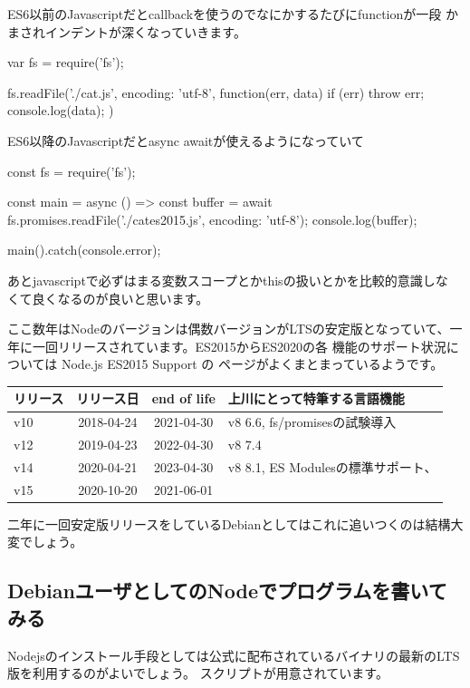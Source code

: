 \documentclass[mingoth,a4paper]{jsarticle}
\begin{document}
ES6以前のJavascriptだとcallbackを使うのでなにかするたびにfunctionが一段
かまされインデントが深くなっていきます。

\begin{commandline}
var fs = require('fs');

fs.readFile('./cat.js', {encoding: 'utf-8'}, function(err, data) {
    if (err) throw err;
    console.log(data);
})
\end{commandline}

ES6以降のJavascriptだとasync awaitが使えるようになっていて

\begin{commandline}
const fs  = require('fs');

const main = async () => {
    const buffer = await fs.promises.readFile('./cates2015.js',
					      {encoding: 'utf-8'});
    console.log(buffer);
}

main().catch(console.error);
\end{commandline}

あとjavascriptで必ずはまる変数スコープとかthisの扱いとかを比較的意識しな
くて良くなるのが良いと思います。

ここ数年はNodeのバージョンは偶数バージョンがLTSの安定版となっていて、一
年に一回リリースされています\cite{nodejsreleases}。ES2015からES2020の各
機能のサポート状況については Node.js ES2015 Support \cite{node-green}の
ページがよくまとまっているようです。

\begin{tabular}{|l|c|c|l|}
\hline
リリース & リリース日 & end of life & 上川にとって特筆する言語機能\\
\hline
v10 & 2018-04-24 & 2021-04-30 & v8 6.6, fs/promisesの試験導入 \\
v12 & 2019-04-23 & 2022-04-30 & v8 7.4\\
v14 & 2020-04-21 & 2023-04-30 & v8 8.1, ES Modulesの標準サポート、 \\
v15 & 2020-10-20 & 2021-06-01 &  \\
\hline
\end{tabular}

二年に一回安定版リリースをしているDebianとしてはこれに追いつくのは結構大
変でしょう。

\subsection{DebianユーザとしてのNodeでプログラムを書いてみる}

Nodejsのインストール手段としては公式に配布されているバイナリの最新のLTS
版を利用するのがよいでしょう\cite{nodejs-install}。
スクリプトが用意されています。
\end{document}
